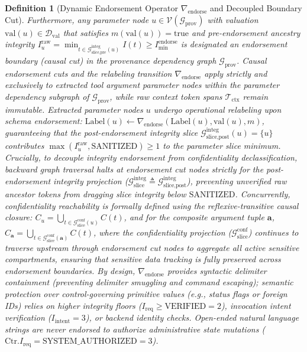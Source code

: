 \documentclass[conference,10pt]{IEEEtran}
\newtheorem{definition}{Definition}
\begin{document}
\begin{definition}[Dynamic Endorsement Operator $\nabla_{\text{endorse}}$ and Decoupled Boundary Cut]
Furthermore, any parameter node $u \in \mathcal{V}(\mathcal{G}_{\text{prov}})$ with valuation $\text{val}(u) \in \mathcal{D}_{\text{val}}$ that satisfies $m(\text{val}(u)) = \text{true}$ and pre-endorsement ancestry integrity $I_u^{\text{raw}} = \min_{t \in \mathcal{G}_{\text{slice,pre}}^{\text{integ}}(u)} I(t) \ge I_{\text{min}}^{\text{endorse}}$ is designated an \textit{endorsement boundary} (causal cut) in the provenance dependency graph $\mathcal{G}_{\text{prov}}$. Causal endorsement cuts and the relabeling transition $\nabla_{\text{endorse}}$ apply strictly and exclusively to extracted tool argument parameter nodes within the parameter dependency subgraph of $\mathcal{G}_{\text{prov}}$, while raw context token spans $\mathcal{T}_{\text{ctx}}$ remain immutable. Extracted parameter nodes $u$ undergo operational relabeling upon schema endorsement: $\text{Label}(u) \leftarrow \nabla_{\text{endorse}}(\text{Label}(u), \text{val}(u), m)$, guaranteeing that the post-endorsement integrity slice $\mathcal{G}_{\text{slice,post}}^{\text{integ}}(u) = \{u\}$ contributes $\max(I_u^{\text{raw}}, \text{SANITIZED}) \ge 1$ to the parameter slice minimum. Crucially, to decouple integrity endorsement from confidentiality declassification, backward graph traversal halts at endorsement cut nodes strictly for the post-endorsement integrity projection ($\mathcal{G}_{\text{slice}}^{\text{integ}} \triangleq \mathcal{G}_{\text{slice,post}}^{\text{integ}}$), preventing unverified raw ancestor tokens from dragging slice integrity below $\text{SANITIZED}$. Concurrently, confidentiality reachability is formally defined using the reflexive-transitive causal closure: $C_u = \bigcup_{t \in \mathcal{G}_{\text{slice}}^{\text{conf}}(u)} C(t)$, and for the composite argument tuple $\mathbf{a}$, $C_{\mathbf{a}} = \bigcup_{t \in \mathcal{G}_{\text{slice}}^{\text{conf}}(\mathbf{a})} C(t)$, where the confidentiality projection ($\mathcal{G}_{\text{slice}}^{\text{conf}}$) continues to traverse upstream through endorsement cut nodes to aggregate all active sensitive compartments, ensuring that sensitive data tracking is fully preserved across endorsement boundaries.
By design, $\nabla_{\text{endorse}}$ provides syntactic delimiter containment (preventing delimiter smuggling and command escaping); semantic protection over control-governing primitive values (e.g., status flags or foreign IDs) relies on higher integrity floors ($I_{\text{req}} \ge \text{VERIFIED} = 2$), invocation intent verification ($I_{\text{intent}} = 3$), or backend identity checks. Open-ended natural language strings are never endorsed to authorize administrative state mutations ($\text{Ctr}.I_{\text{req}} = \text{SYSTEM\_AUTHORIZED} = 3$).
\end{definition}
\end{document}
